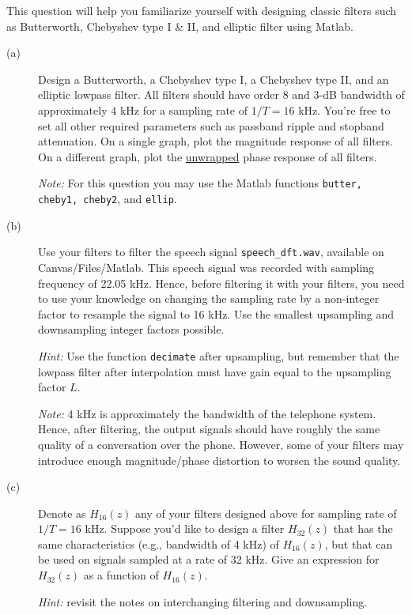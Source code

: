 \documentclass[12pt]{report}
\begin{document}
This question will help you familiarize yourself with designing classic filters such as Butterworth, Chebyshev type I \& II, and elliptic filter using Matlab. 
\begin{description}
	\item[(a)] Design a Butterworth, a Chebyshev type I, a Chebyshev type II, and an elliptic lowpass filter. All filters should have order 8 and 3-dB bandwidth of approximately $4$ kHz for a sampling rate of $1/T = 16$ kHz. You're free to set all other required parameters such as passband ripple and stopband attenuation. On a single graph, plot the magnitude response of all filters. On a different graph, plot the \underline{unwrapped} phase response of all filters.
	
	\textit{Note:} For this question you may use the Matlab functions \texttt{butter, cheby1, cheby2}, and \texttt{ellip}.  
	
	\item[(b)] Use your filters to filter the speech signal \texttt{speech\_dft.wav}, available on Canvas/Files/Matlab. This speech signal was recorded with sampling frequency of 22.05 kHz. Hence, before filtering it with your filters, you need to use your knowledge on changing the sampling rate by a non-integer factor to resample the signal to 16 kHz. Use the smallest upsampling and downsampling integer factors possible.
	 
	\textit{Hint:} Use the function \texttt{decimate} after upsampling, but remember that the lowpass filter after interpolation must have gain equal to the upsampling factor $L$.
	
	\textit{Note:} 4 kHz is approximately the bandwidth of the telephone system. Hence, after filtering, the output signals should have roughly the same quality of a conversation over the phone. However, some of your filters may introduce enough magnitude/phase distortion to worsen the sound quality.
	
	\item[(c)] Denote as $H_{16}(z)$ any of your filters designed above for sampling rate of $1/T = 16$ kHz. Suppose
	you'd like to design a filter $H_{32}(z)$ that has the same characteristics (e.g., bandwidth of 4 kHz) of $H_{16}(z)$, but that can be used on signals sampled at a rate of 32 kHz. Give an expression for $H_{32}(z)$ as a function of $H_{16}(z)$.
	
	\textit{Hint:} revisit the notes on interchanging filtering and downsampling.
\end{description}
\end{document}
